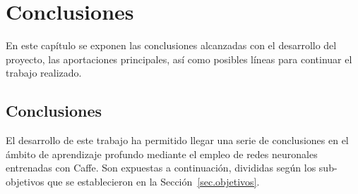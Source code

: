 \chapter{Conclusiones}\label{cap.conclusiones}
En este capítulo se exponen las conclusiones alcanzadas con el desarrollo del proyecto, las aportaciones principales, así como posibles líneas para continuar el trabajo realizado.

\section{Conclusiones}
El desarrollo de este trabajo ha permitido llegar una serie de conclusiones en el ámbito de aprendizaje profundo mediante el empleo de redes neuronales entrenadas con Caffe. Son expuestas a continuación, divididas según los sub-objetivos que se establecieron en la Sección~\ref{sec.objetivos}.
